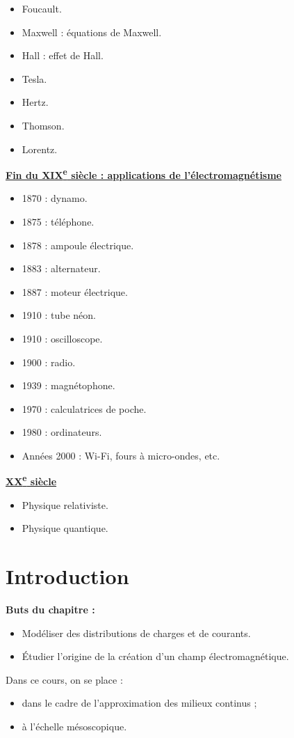 \documentclass[11pt,a4paper]{article}
\newcommand{\titr}[1]{\par\Needspace{4\baselineskip}\textbf{\underline{#1}}\par\nopagebreak[3]}
\begin{document}
\begin{itemize}\item Foucault.\item Maxwell : équations de Maxwell.\item Hall : effet de Hall.\item Tesla.\item Hertz.\item Thomson.\item Lorentz.\end{itemize}
\titr{Fin du XIX\textsuperscript{e} siècle : applications de l'électromagnétisme}
\begin{itemize}\item 1870 : dynamo.\item 1875 : téléphone.\item 1878 : ampoule électrique.\item 1883 : alternateur.\item 1887 : moteur électrique.\item 1910 : tube néon.\item 1910 : oscilloscope.\item 1900 : radio.\item 1939 : magnétophone.\item 1970 : calculatrices de poche.\item 1980 : ordinateurs.\item Années 2000 : Wi-Fi, fours à micro-ondes, etc.\end{itemize}
\titr{XX\textsuperscript{e} siècle}
\begin{itemize}\item Physique relativiste.\item Physique quantique.\end{itemize}
\endgroup
\section{Introduction}
\textbf{Buts du chapitre :}
\begin{itemize}\item Modéliser des distributions de charges et de courants.\item Étudier l'origine de la création d'un champ électromagnétique.\end{itemize}
Dans ce cours, on se place :
\begin{itemize}\item dans le cadre de l'approximation des milieux continus ;\item à l'échelle mésoscopique.\end{itemize}
\clearpage
\end{document}
